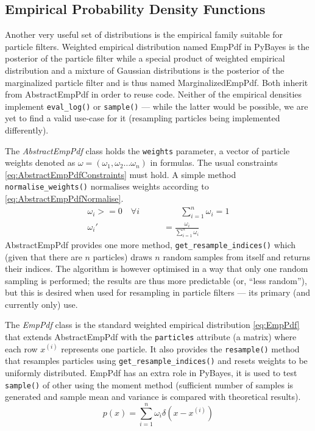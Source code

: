 \subsection{Empirical Probability Density Functions}

Another very useful set of distributions is the empirical family suitable for particle filters.
Weighted empirical distribution named EmpPdf in PyBayes is the posterior {\pdf} of the
particle filter while a special product of weighted empirical distribution and a mixture of Gaussian
distributions is the posterior {\pdf} of the marginalized particle filter and is thus named
MarginalizedEmpPdf. Both inherit from AbstractEmpPdf in order to reuse code. Neither of the empirical
densities implement \verb|eval_log()| or \verb|sample()| --- while the latter would be possible, we
are yet to find a valid use-case for it (resampling particles being implemented differently).

The \emph{AbstractEmpPdf} class holds the \verb|weights| parameter, a vector of particle weights denoted as
\(\omega = (\omega_1, \omega_2 \dots \omega_n)\) in formulas. The usual constraints
\eqref{eq:AbstractEmpPdfConstraints} must hold. A simple method \verb|normalise_weights()| normalises
weights according to \eqref{eq:AbstractEmpPdfNormalise}.
\begin{align}
	\omega_i >= 0 \quad \forall i \quad \quad & \quad \quad \sum_{i=1}^n \omega_i = 1 \label{eq:AbstractEmpPdfConstraints} \\
	\omega_i' &= \frac{\omega_i}{\sum_{i=1}^n \omega_i} \label{eq:AbstractEmpPdfNormalise}
\end{align}
AbstractEmpPdf provides one more method, \verb|get_resample_indices()| which
(given that there are \(n\) particles) draws \(n\) random samples from itself and returns their
indices. The algorithm is however optimised in a way that only one random sampling is performed; the
results are thus more predictable (or, ``less random''), but this is desired when used for resampling
in particle filters --- its primary (and currently only) use.

The \emph{EmpPdf} class is the standard weighted empirical distribution \eqref{eq:EmpPdf} that extends
AbstractEmpPdf with the \verb|particles| attribute (a matrix) where each row \(x^{(i)}\) represents
one particle. It also provides the \verb|resample()| method that resamples particles using
\verb|get_resample_indices()| and resets weights to be uniformly distributed. EmpPdf has an extra
role in PyBayes, it is used to test \verb|sample()| of other {\pdfs} using the moment method
(sufficient number of samples is generated and sample mean and variance is compared with theoretical
results).
\begin{equation} \label{eq:EmpPdf}
	p(x) = \sum_{i=1}^n \omega_i \delta(x - x^{(i)})
\end{equation}

